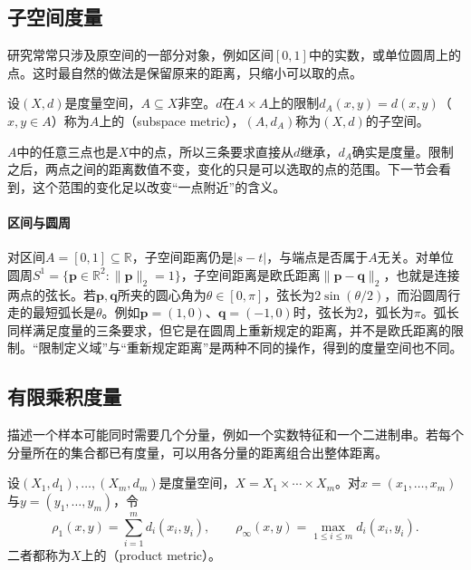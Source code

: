 \subsection{子空间度量}
\label{sec:metric-subspace}

研究常常只涉及原空间的一部分对象，例如区间$[0,1]$中的实数，或单位圆周上的点。这时最自然的做法是保留原来的距离，只缩小可以取的点。

\begin{definition}[子空间度量]
\label{def:metric-subspace}
设$(X,d)$是度量空间，$A\subseteq X$非空。$d$在$A\times A$上的限制$d_A(x,y)=d(x,y)$（$x,y\in A$）称为$A$上的（subspace metric），$(A,d_A)$称为$(X,d)$的子空间。
\end{definition}

$A$中的任意三点也是$X$中的点，所以三条要求直接从$d$继承，$d_A$确实是度量。限制之后，两点之间的距离数值不变，变化的只是可以选取的点的范围。下一节会看到，这个范围的变化足以改变“一点附近”的含义。

\paragraph{区间与圆周}
对区间$A=[0,1]\subseteq\mathbb R$，子空间距离仍是$|s-t|$，与端点是否属于$A$无关。对单位圆周$S^1=\{\bm p\in\mathbb R^2:\lVert\bm p\rVert_2=1\}$，子空间距离是欧氏距离$\lVert\bm p-\bm q\rVert_2$，也就是连接两点的弦长。若$\bm p,\bm q$所夹的圆心角为$\theta\in[0,\pi]$，弦长为$2\sin(\theta/2)$，而沿圆周行走的最短弧长是$\theta$。例如$\bm p=(1,0)$、$\bm q=(-1,0)$时，弦长为$2$，弧长为$\pi$。弧长同样满足度量的三条要求，但它是在圆周上重新规定的距离，并不是欧氏距离的限制。“限制定义域”与“重新规定距离”是两种不同的操作，得到的度量空间也不同。

\subsection{有限乘积度量}
\label{sec:metric-product}

描述一个样本可能同时需要几个分量，例如一个实数特征和一个二进制串。若每个分量所在的集合都已有度量，可以用各分量的距离组合出整体距离。

\begin{definition}[有限乘积度量]
\label{def:metric-product}
设$(X_1,d_1),\dots,(X_m,d_m)$是度量空间，$X=X_1\times\cdots\times X_m$。对$x=(x_1,\dots,x_m)$与$y=(y_1,\dots,y_m)$，令
\[
  \rho_1(x,y)=\sum_{i=1}^m d_i(x_i,y_i),\qquad
  \rho_\infty(x,y)=\max_{1\leq i\leq m}d_i(x_i,y_i).
\]
二者都称为$X$上的（product metric）。
\end{definition}

